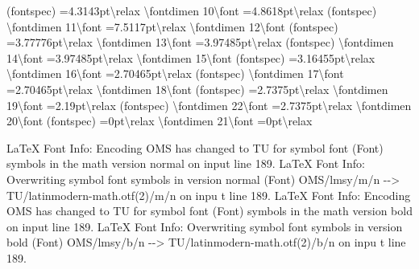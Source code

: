 \documentclass[
  letterpaper,
  DIV=11,
  numbers=noendperiod]{scrartcl}
\newenvironment{Shaded}{\begin{snugshade}}{\end{snugshade}}
\newcommand{\NormalTok}[1]{\textcolor[rgb]{0.00,0.23,0.31}{#1}}
\begin{document}
\begin{Shaded}
\begin{Highlighting}[]
\NormalTok{(fontspec)             =4.3143pt\textbackslash{}relax \textbackslash{}fontdimen 10\textbackslash{}font =4.8618pt\textbackslash{}relax}
\NormalTok{(fontspec)             \textbackslash{}fontdimen 11\textbackslash{}font =7.5117pt\textbackslash{}relax \textbackslash{}fontdimen 12\textbackslash{}font}
\NormalTok{(fontspec)             =3.77776pt\textbackslash{}relax \textbackslash{}fontdimen 13\textbackslash{}font =3.97485pt\textbackslash{}relax}
\NormalTok{(fontspec)             \textbackslash{}fontdimen 14\textbackslash{}font =3.97485pt\textbackslash{}relax \textbackslash{}fontdimen 15\textbackslash{}font}
\NormalTok{(fontspec)             =3.16455pt\textbackslash{}relax \textbackslash{}fontdimen 16\textbackslash{}font =2.70465pt\textbackslash{}relax}
\NormalTok{(fontspec)             \textbackslash{}fontdimen 17\textbackslash{}font =2.70465pt\textbackslash{}relax \textbackslash{}fontdimen 18\textbackslash{}font}
\NormalTok{(fontspec)             =2.7375pt\textbackslash{}relax \textbackslash{}fontdimen 19\textbackslash{}font =2.19pt\textbackslash{}relax}
\NormalTok{(fontspec)             \textbackslash{}fontdimen 22\textbackslash{}font =2.7375pt\textbackslash{}relax \textbackslash{}fontdimen 20\textbackslash{}font}
\NormalTok{(fontspec)             =0pt\textbackslash{}relax \textbackslash{}fontdimen 21\textbackslash{}font =0pt\textbackslash{}relax }

\NormalTok{LaTeX Font Info:    Encoding \textasciigrave{}OMS\textquotesingle{} has changed to \textasciigrave{}TU\textquotesingle{} for symbol font}
\NormalTok{(Font)              \textasciigrave{}symbols\textquotesingle{} in the math version \textasciigrave{}normal\textquotesingle{} on input line 189.}
\NormalTok{LaTeX Font Info:    Overwriting symbol font \textasciigrave{}symbols\textquotesingle{} in version \textasciigrave{}normal\textquotesingle{}}
\NormalTok{(Font)                  OMS/lmsy/m/n {-}{-}\textgreater{} TU/latinmodern{-}math.otf(2)/m/n on inpu}
\NormalTok{t line 189.}
\NormalTok{LaTeX Font Info:    Encoding \textasciigrave{}OMS\textquotesingle{} has changed to \textasciigrave{}TU\textquotesingle{} for symbol font}
\NormalTok{(Font)              \textasciigrave{}symbols\textquotesingle{} in the math version \textasciigrave{}bold\textquotesingle{} on input line 189.}
\NormalTok{LaTeX Font Info:    Overwriting symbol font \textasciigrave{}symbols\textquotesingle{} in version \textasciigrave{}bold\textquotesingle{}}
\NormalTok{(Font)                  OMS/lmsy/b/n {-}{-}\textgreater{} TU/latinmodern{-}math.otf(2)/b/n on inpu}
\NormalTok{t line 189.}


\end{Highlighting}
\end{Shaded}
\end{document}
